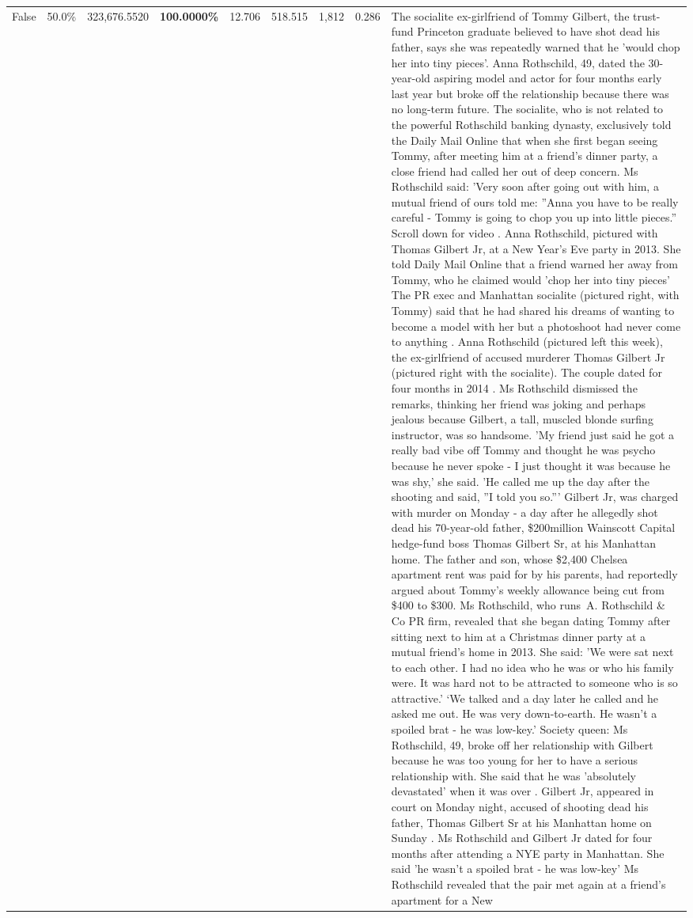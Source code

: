 \begin{table}[H]
\begin{tabular}{lllrlllll}
False & 50.0\% & 323,676.5520 & \bfseries \color{red} 100.0000\% & 12.706 & 518.515 & 1,812 & 0.286 & The socialite ex-girlfriend of Tommy Gilbert, the trust-fund Princeton graduate believed to have shot dead his father, says she was repeatedly warned that he 'would chop her into tiny pieces'. Anna Rothschild, 49, dated the 30-year-old aspiring model and actor for four months early last year but broke off the relationship because there was no long-term future. The socialite, who is not related to the powerful Rothschild banking dynasty, exclusively told the Daily Mail Online that when she first began seeing Tommy, after meeting him at a friend's dinner party, a close friend had called her out of deep concern. Ms Rothschild said: 'Very soon after going out with him, a mutual friend of ours told me: ''Anna you have to be really careful - Tommy is going to chop you up into little pieces.'' Scroll down for video . Anna Rothschild, pictured with Thomas Gilbert Jr, at a New Year's Eve party in 2013. She told Daily Mail Online that a friend warned her away from Tommy, who he claimed would 'chop her into tiny pieces' The PR exec and Manhattan socialite (pictured right, with Tommy) said that he had shared his dreams of wanting to become a model with her but a photoshoot had never come to anything . Anna Rothschild (pictured left this week), the ex-girlfriend of accused murderer Thomas Gilbert Jr (pictured right with the socialite). The couple dated for four months in 2014 . Ms Rothschild dismissed the remarks, thinking her friend was joking and perhaps jealous because Gilbert, a tall, muscled blonde surfing instructor, was so handsome. 'My friend just said he got a really bad vibe off Tommy and thought he was psycho because he never spoke - I just thought it was because he was shy,' she said. 'He called me up the day after the shooting and said, ''I told you so.''' Gilbert Jr, was charged with murder on Monday - a day after he allegedly shot dead his 70-year-old father, \$200million Wainscott Capital hedge-fund boss Thomas Gilbert Sr, at his Manhattan home. The father and son, whose \$2,400 Chelsea apartment rent was paid for by his parents, had reportedly argued about Tommy's weekly allowance being cut from \$400 to \$300. Ms Rothschild, who runs A. Rothschild \& Co PR firm, revealed that she began dating Tommy after sitting next to him at a Christmas dinner party at a mutual friend's home in 2013. She said: 'We were sat next to each other. I had no idea who he was or who his family were. It was hard not to be attracted to someone who is so attractive.' ‘We talked and a day later he called and he asked me out. He was very down-to-earth. He wasn’t a spoiled brat - he was low-key.’ Society queen: Ms Rothschild, 49, broke off her relationship with Gilbert because he was too young for her to have a serious relationship with. She said that he was 'absolutely devastated' when it was over . Gilbert Jr, appeared in court on Monday night, accused of shooting dead his father, Thomas Gilbert Sr at his Manhattan home on Sunday . Ms Rothschild and Gilbert Jr dated for four months after attending a NYE party in Manhattan. She said 'he wasn't a spoiled brat - he was low-key' Ms Rothschild revealed that the pair met again at a friend’s apartment for a New 
\end{tabular}
\end{table}
